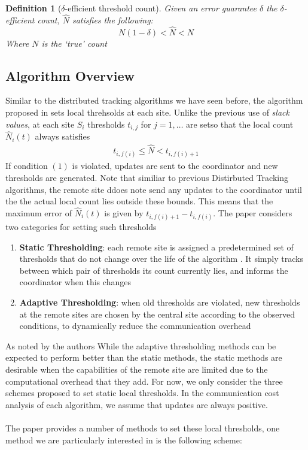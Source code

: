 \documentclass{article}
\newtheorem{definition}{Definition}
\begin{document}
\begin{definition}[$\delta$-efficient threshold count]
Given an error guarantee $\delta$ the $\delta$-efficient count, $\hat{N}$ satisfies the following: 
$$N(1-\delta) < \hat{N} < N$$
Where $N$ is the \textit{`true'} count 
\end{definition}

\subsection*{Algorithm Overview}
Similar to the distributed tracking algorithms we have seen before, the algorithm proposed in \cite{10.1145/1142473.1142507} sets local threhsolds at each site. Unlike the previous use of \textit{slack values}, at each site $S_i$ thresholds $t_{i,j}$ for $j=1,\dots$ are setso that the local count $\hat{N}_i(t)$ always satisfies
\begin{align}
    t_{i,f(i)} \leq \hat{N} < t_{i,f(i)+1}
\end{align}
If condition $(1)$ is violated, updates are sent to the coordinator and new thresholds are generated. Note that similiar to previous Distirbuted Tracking algorithms, the remote site ddoes note send any updates to the coordinator until the the actual local count lies outside these bounds. This means that the maximum error of $\hat{N}_i(t)$ is given by $t_{i,f(i)+1} - t_{i,f(i)}$. The paper considers two categories for setting such thresholds 
\begin{enumerate}
    \item \textbf{Static Thresholding}: each remote site is assigned a predetermined set of thresholds that do not change over the life of the algorithm . It simply tracks between which pair of thresholds its count currently lies, and informs the coordinator when this
changes
    \item \textbf{Adaptive Thresholding}: when old thresholds are violated, new thresholds at the remote sites are chosen by the central site according to the observed conditions, to dynamically reduce the communication overhead
\end{enumerate}
As noted by the authors While the adaptive thresholding methods can be expected to perform better than the static methods, the static methods are desirable when the capabilities of the remote site are limited due to the computational overhead that they add. For now, we only consider the three schemes proposed to set static local thresholds. In the communication cost analysis of each algorithm, we assume that updates are always positive. \\
\\
The paper provides a number of methods to set these local thresholds, one method we are particularly interested in is the following scheme: 
\end{document}
